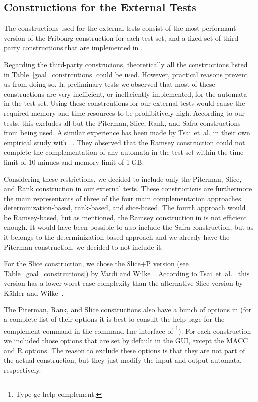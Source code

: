 \subsection{Constructions for the External Tests}
The constructions used for the external tests consist of the most performant version of the Fribourg construction for each test set, and a fixed set of third-party constructions that are implemented in \goal.

Regarding the third-party construcions, theoretically all the constructions listed in Table~\ref{goal_constrcutions} could be used. However, practical reasons prevent us from doing so. In preliminary tests we observed that most of these constructions are very inefficient, or inefficiently implemented, for the automata in the \goal{} test set. Using these constrcutions for our external tests would cause the required memory and time resources to be prohibitively high. According to our tests, this excludes all but the Piterman, Slice, Rank, and Safra constructions from being used. A similar experience has been made by Tsai~et~al. in their own empirical study with \goal~\cite{2011_tsai}. They observed that the Ramsey construction could not complete the complementation of any automata in the \goal{} test set within the time limit of 10 minues and memory limit of 1 GB.

Considering these restrictions, we decided to include only the Piterman, Slice, and Rank construction in our external tests. These constructions are furthermore the main representants of three of the four main complementation approaches, determinization-based, rank-based, and slice-based. The fourth approach would be Ramsey-based, but as mentioned, the Ramsey construction in \goal{} is not efficient enough. It would have been possible to also include the Safra construction, but as it belongs to the determinization-based approach and we already have the Piterman construction, we decided to not include it.

For the Slice construction, we chose the Slice+P version (see Table~\ref{goal_constrcutions}) by Vardi and Wilke~\cite{vardi2007automata}. According to Tsai~et~al.~\cite{2011_tsai} this version has a lower worst-case complexity than the alternative Slice version by Kähler and Wilke~\cite{2008_kaehler}.

The Piterman, Rank, and Slice constructions also have a bunch of options in \goal (for a complete list of their options it is best to consult the help page for the \textsf{complement} command in the command line interface of \goal\footnote{Type \textsf{gc help complement}.}). For each construction we included those options that are set by default in the \goal{} GUI, except the MACC and R options. The reason to exclude these options is that they are not part of the actual construction, but they just modify the input and output automata, respectively.

